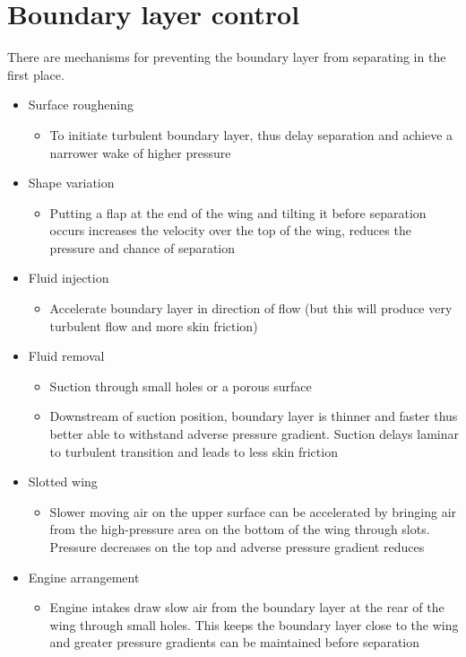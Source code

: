 \documentclass[class=report, crop=false, 12pt,a4paper]{standalone}
\begin{document}
\section{Boundary layer control}
There are mechanisms for preventing the boundary layer from separating in the first place.
\begin{itemize}
  \item Surface roughening
  \begin{itemize}
    \item To initiate turbulent boundary layer, thus delay separation and achieve a narrower wake of higher pressure
  \end{itemize}
  \item Shape variation
  \begin{itemize}
    \item Putting a flap at the end of the wing and tilting it before separation occurs increases the velocity over the top of the wing, reduces the pressure and chance of separation 
  \end{itemize}
  \item Fluid injection
  \begin{itemize}
    \item Accelerate boundary layer in direction of flow (but this will produce very turbulent flow and more skin friction)
  \end{itemize}
  \item Fluid removal
  \begin{itemize}
    \item Suction through small holes or a porous surface
    \item Downstream of suction position, boundary layer is thinner and faster thus better able to withstand adverse pressure gradient. Suction delays laminar to turbulent transition and leads to less skin friction
  \end{itemize}
  \item Slotted wing
  \begin{itemize}
    \item Slower moving air on the upper surface can be accelerated by bringing air from the high-pressure area on the bottom of the wing through slots. Pressure decreases on the top and adverse pressure gradient reduces
  \end{itemize}
  \item Engine arrangement
  \begin{itemize}
    \item Engine intakes draw slow air from the boundary layer at the rear of the wing through small holes. This keeps the boundary layer close to the wing and greater pressure gradients can be maintained before separation
  \end{itemize}
\end{itemize}
\end{document}
